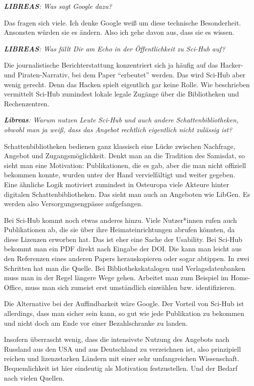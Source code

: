 \documentclass[a4paper,
fontsize=11pt,
oneside,
numbers=noperiodatend,
parskip=half-,
bibliography=totoc,
final
]{scrartcl}
\begin{document}
\emph{\textbf{LIBREAS}: Was sagt Google dazu?}

Das fragen sich viele. Ich denke Google weiß um diese technische
Besonderheit. Ansonsten würden sie es ändern. Also ich gehe davon aus,
dass sie es wissen.

\emph{\textbf{LIBREAS}: Was fällt Dir am Echo in der Öffentlichkeit zu
Sci-Hub auf?}

Die journalistische Berichterstattung konzentriert sich ja häufig auf
das Hacker- und Piraten-Narrativ, bei dem Paper \enquote{erbeutet}
werden. Das wird Sci-Hub aber wenig gerecht. Denn das Hacken spielt
eigentlich gar keine Rolle. Wie beschrieben vermittelt Sci-Hub zumindest
lokale legale Zugänge über die Bibliotheken und Rechenzentren.

\emph{\textbf{Libreas}: Warum nutzen Leute Sci-Hub und auch andere
Schattenbibliotheken, obwohl man ja weiß, dass das Angebot rechtlich
eigentlich nicht zulässig ist?}

Schattenbibliotheken bedienen ganz klassisch eine Lücke zwischen
Nachfrage, Angebot und Zugangsmöglichkeit. Denkt man an die Tradition
des Samisdat, so sieht man eine Motivation: Publikationen, die es gab,
aber die man nicht offiziell bekommen konnte, wurden unter der Hand
vervielfältigt und weiter gegeben. Eine ähnliche Logik motiviert
zumindest in Osteuropa viele Akteure hinter digitalen
Schattenbibliotheken. Das sieht man auch an Angeboten wie LibGen. Es
werden also Versorgungsengpässe aufgefangen.

Bei Sci-Hub kommt noch etwas anderes hinzu. Viele Nutzer*innen rufen
auch Publikationen ab, die sie über ihre Heimateinrichtungen abrufen
könnten, da diese Lizenzen erworben hat. Das ist eher eine Sache der
Usability. Bei Sci-Hub bekommt man ein PDF direkt nach Eingabe der DOI.
Die kann man leicht aus den Referenzen eines anderen Papers
herauskopieren oder sogar abtippen. In zwei Schritten hat man die
Quelle. Bei Bibliothekskatalogen und Verlagsdatenbanken muss man in der
Regel längere Wege gehen. Arbeitet man zum Beispiel im Home-Office, muss
man sich zumeist erst umständlich einwählen bzw. identifizieren.

Die Alternative bei der Auffindbarkeit wäre Google. Der Vorteil von
Sci-Hub ist allerdings, dass man sicher sein kann, so gut wie jede
Publikation zu bekommen und nicht doch am Ende vor einer Bezahlschranke
zu landen.

Insofern überrascht wenig, dass die intensivste Nutzung des Angebots
nach Russland aus den USA und aus Deutschland zu verzeichnen ist, also
prinzipiell reichen und lizenzstarken Ländern mit einer sehr
umfangreichen Wissenschaft. Bequemlichkeit ist hier eindeutig als
Motivation festzustellen. Und der Bedarf nach vielen Quellen.
\end{document}
